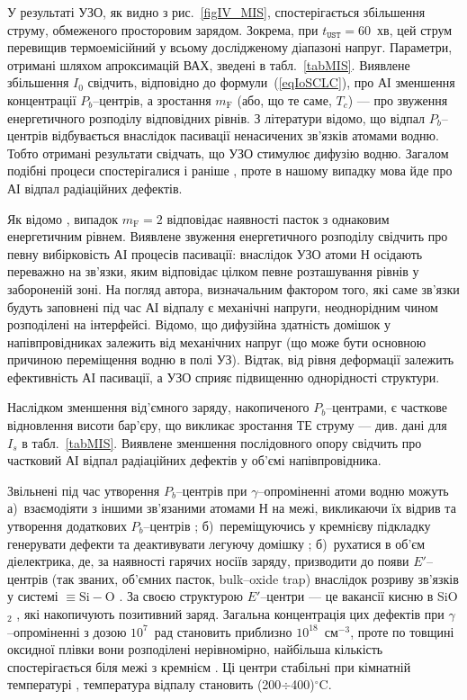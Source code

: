 У результаті УЗО, як видно з рис.~\ref{figIV_MIS}, спостерігається збільшення струму, обмеженого просторовим зарядом.
Зокрема, при $t_\mathtt{UST}=60$~хв, цей струм перевищив термоемісійний у всьому дослідженому діапазоні напруг.
Параметри, отримані шляхом апроксимацій ВАХ, зведені в табл.~\ref{tabMIS}.
Виявлене збільшення $I_0$ свідчить, відповідно до формули~(\ref{eqIoSCLC}), про АІ зменшення концентрації $P_b$--центрів, а зростання $m_\mathrm{F}$ (або, що те саме, $T_c$) --- про звуження енергетичного розподілу відповідних рівнів.
З літератури \cite{SiO2:Takakura,SiO2:Wurzer} відомо, що відпал $P_b$--центрів відбувається внаслідок пасивації ненасичених зв'язків атомами водню.
Тобто отримані результати свідчать, що УЗО стимулює дифузію водню.
Загалом подібні процеси спостерігалися і раніше \cite{Ostap:SiO2,Ostap:PhotoLum,ostapenko1997}, проте в нашому випадку мова йде про АІ відпал радіаційних дефектів.


Як відомо \cite{Jafar}, випадок $m_\mathrm{F}=2$ відповідає наявності пасток з однаковим енергетичним рівнем.
Виявлене звуження енергетичного розподілу свідчить про певну вибірковість АІ процесів пасивації:
внаслідок УЗО атоми Н осідають переважно на зв'язки, яким відповідає цілком певне розташування рівнів у забороненій зоні.
На погляд автора, визначальним фактором того, які саме зв'язки будуть заповнені під час АІ відпалу є механічні напруги, неоднорідним чином розподілені на інтерфейсі.
Відомо, що дифузійна здатність домішок у напівпровідниках залежить від механічних напруг \cite{AZIZ2001}
(що може бути основною причиною переміщення водню в полі УЗ).
Відтак, від рівня деформації залежить ефективність АІ пасивації, а УЗО сприяє підвищенню однорідності структури.

Наслідком зменшення від'ємного заряду, накопиченого $P_b$--центрами, є часткове відновлення висоти бар'єру, що викликає зростання ТЕ струму --- див. дані для $I_s$ в табл.~\ref{tabMIS}.
Виявлене зменшення послідовного опору свідчить про частковий АІ відпал радіаційних дефектів у об'ємі напівпровідника.

Звільнені під час утворення $P_b$--центрів при $\gamma$--опроміненні атоми водню можуть
а)~взаємодіяти з іншими зв'язаними атомами Н на межі, викликаючи їх відрив та утворення додаткових $P_b$--центрів \cite{SiO2:Devine};
б)~переміщуючись у кремнієву підкладку генерувати дефекти та деактивувати легуючу домішку \cite{SiO2:DiMaria};
б)~рухатися в об'єм діелектрика, де, за наявності гарячих носіїв заряду, призводити до появи $E'$--центрів (так званих, об'ємних пасток, bulk--oxide trap) внаслідок розриву зв'язків у системі $\equiv\!\text{Si}\!-\!\text{O}$ \cite{SiO2:Mahapatra,SiO2:Esseni}.
За своєю структурою $E'$--центри --- це вакансії кисню в SiO$_2$ \cite{SiO2:Takakura,SiO2:Devine},
які накопичують позитивний заряд.
Загальна концентрація цих дефектів при $\gamma$--опроміненні з дозою $10^{7}$~рад становить приблизно $10^{18}$~см$^{-3}$, проте по товщині оксидної плівки вони розподілені нерівномірно, найбільша кількість спостерігається біля межі з кремнієм \cite{PersenkovBook}.
Ці центри стабільні при кімнатній температурі \cite{SiO2:Mahapatra}, температура відпалу становить (200$\div$400)$^\circ$C.


